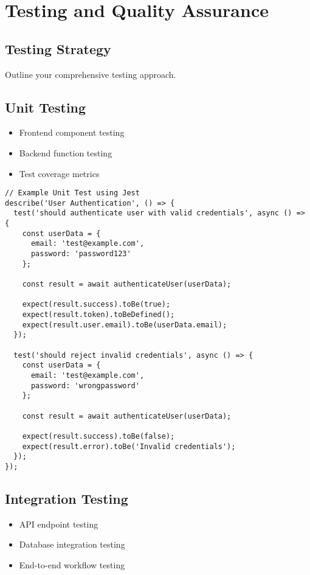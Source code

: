 \documentclass[12pt,a4paper]{article}
\begin{document}
\section{Testing and Quality Assurance}
\label{sec:testing}

\subsection{Testing Strategy}
Outline your comprehensive testing approach.

\subsection{Unit Testing}
\begin{itemize}
    \item Frontend component testing
    \item Backend function testing
    \item Test coverage metrics
\end{itemize}

\begin{lstlisting}[caption=Example Unit Test]
// Example Unit Test using Jest
describe('User Authentication', () => {
  test('should authenticate user with valid credentials', async () => {
    const userData = {
      email: 'test@example.com',
      password: 'password123'
    };
    
    const result = await authenticateUser(userData);
    
    expect(result.success).toBe(true);
    expect(result.token).toBeDefined();
    expect(result.user.email).toBe(userData.email);
  });
  
  test('should reject invalid credentials', async () => {
    const userData = {
      email: 'test@example.com',
      password: 'wrongpassword'
    };
    
    const result = await authenticateUser(userData);
    
    expect(result.success).toBe(false);
    expect(result.error).toBe('Invalid credentials');
  });
});
\end{lstlisting}

\subsection{Integration Testing}
\begin{itemize}
    \item API endpoint testing
    \item Database integration testing
    \item End-to-end workflow testing
\end{itemize}
\end{document}

